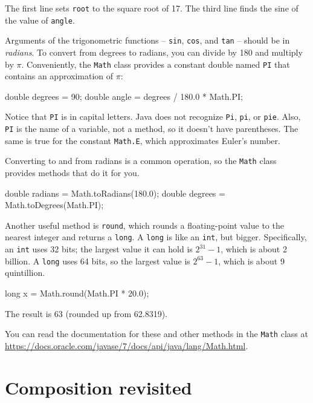 \documentclass[12pt]{book}
\theoremstyle{exercise}
\newcommand{\java}[1]{\verb"#1"}
\begin{document}
The first line sets \java{root} to the square root of 17.
The third line finds the sine of the value of \java{angle}.


Arguments of the trigonometric functions -- \java{sin}, \java{cos}, and \java{tan} -- should be in {\em radians}.
To convert from degrees to radians, you can divide by 180 and multiply by $\pi$.
Conveniently, the \java{Math} class provides a constant double named \java{PI} that contains an approximation of $\pi$:

\begin{code}
    double degrees = 90;
    double angle = degrees / 180.0 * Math.PI;
\end{code}

Notice that \java{PI} is in capital letters.
Java does not recognize \java{Pi}, \java{pi}, or \java{pie}.
Also, \java{PI} is the name of a variable, not a method, so it doesn't have parentheses.
The same is true for the constant \java{Math.E}, which approximates Euler's number.

Converting to and from radians is a common operation, so the \java{Math} class provides methods that do it for you.

\begin{code}
    double radians = Math.toRadians(180.0);
    double degrees = Math.toDegrees(Math.PI);
\end{code}


Another useful method is \java{round}, which rounds a floating-point value to the nearest integer and returns a \java{long}.
A \java{long} is like an \java{int}, but bigger.
Specifically, an \java{int} uses 32 bits; the largest value it can hold is $2^{31}-1$, which is about 2 billion.
A \java{long} uses 64 bits, so the largest value is $2^{63}-1$, which is about 9 quintillion.

\begin{code}
    long x = Math.round(Math.PI * 20.0);
\end{code}

The result is 63 (rounded up from 62.8319).

You can read the documentation for these and other methods in the \java{Math} class at \url{https://docs.oracle.com/javase/7/docs/api/java/lang/Math.html}.


\section{Composition revisited}
\end{document}
